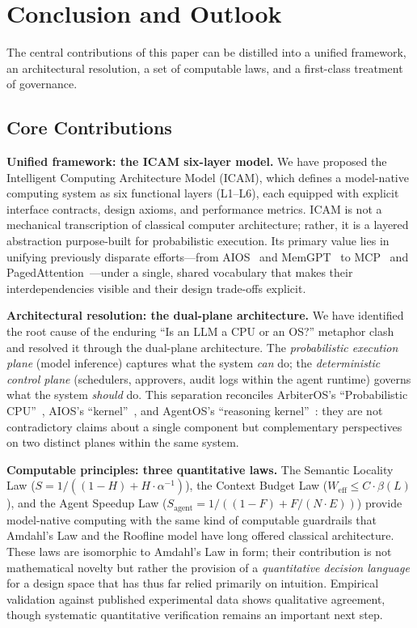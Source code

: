\documentclass[11pt,a4paper]{article}
\newcounter{axiom}[section]
\begin{document}




\section{Conclusion and Outlook}
\label{sec:conclusion}

The central contributions of this paper can be distilled into a unified framework, an architectural resolution, a set of computable laws, and a first-class treatment of governance.

\subsection{Core Contributions}

\textbf{Unified framework: the ICAM six-layer model.}
We have proposed the Intelligent Computing Architecture Model (ICAM), which defines a model-native computing system as six functional layers (L1--L6), each equipped with explicit interface contracts, design axioms, and performance metrics. ICAM is not a mechanical transcription of classical computer architecture; rather, it is a layered abstraction purpose-built for probabilistic execution. Its primary value lies in unifying previously disparate efforts---from AIOS~\cite{mei2024aios} and MemGPT~\cite{memgpt2023} to MCP~\cite{mcp_intro_2026} and PagedAttention~\cite{kwon2023pagedattention}---under a single, shared vocabulary that makes their interdependencies visible and their design trade-offs explicit.

\textbf{Architectural resolution: the dual-plane architecture.}
We have identified the root cause of the enduring ``Is an LLM a CPU or an OS?'' metaphor clash and resolved it through the dual-plane architecture. The \textit{probabilistic execution plane} (model inference) captures what the system \emph{can} do; the \textit{deterministic control plane} (schedulers, approvers, audit logs within the agent runtime) governs what the system \emph{should} do. This separation reconciles ArbiterOS's ``Probabilistic CPU''~\cite{arbiteros2025}, AIOS's ``kernel''~\cite{mei2024aios}, and AgentOS's ``reasoning kernel''~\cite{agentos2025}: they are not contradictory claims about a single component but complementary perspectives on two distinct planes within the same system.

\textbf{Computable principles: three quantitative laws.}
The Semantic Locality Law ($S = 1/((1-H) + H \cdot \alpha^{-1})$), the Context Budget Law ($W_{\mathrm{eff}} \leq C \cdot \beta(L)$), and the Agent Speedup Law ($S_{\mathrm{agent}} = 1/((1-F) + F/(N \cdot E))$) provide model-native computing with the same kind of computable guardrails that Amdahl's Law and the Roofline model have long offered classical architecture. These laws are isomorphic to Amdahl's Law in form; their contribution is not mathematical novelty but rather the provision of a \emph{quantitative decision language} for a design space that has thus far relied primarily on intuition. Empirical validation against published experimental data shows qualitative agreement, though systematic quantitative verification remains an important next step.
\end{document}
